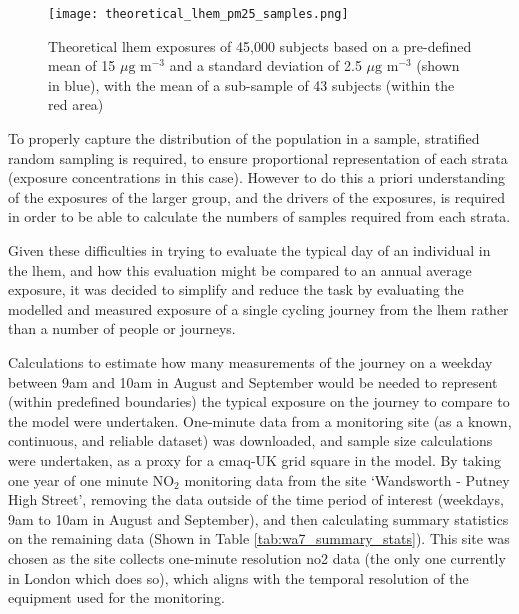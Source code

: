 \begin{figure}[H]
\centering
\texttt{[image: theoretical\_lhem\_pm25\_samples.png]}
\caption{Theoretical \gls{lhem} exposures of 45,000 subjects based on a pre-defined mean of 15 $\mu \text{g m}^{-3}$ and a standard deviation of 2.5 $\mu \text{g m}^{-3}$ (shown in blue), with the mean of a sub-sample of 43 subjects (within the red area)}
\label{fig:theoretical_lhem_pm25_samples}
\end{figure}

To properly capture the distribution of the population in a sample, stratified random sampling is required, to ensure proportional representation of each strata (exposure concentrations in this case). However to do this a priori understanding of the exposures of the larger group, and the drivers of the exposures, is required in order to be able to calculate the numbers of samples required from each strata.

Given these difficulties in trying to evaluate the typical day of an individual in the \gls{lhem}, and how this evaluation might be compared to an annual average exposure, it was decided to simplify and reduce the task by evaluating the modelled and measured exposure of a single cycling journey from the \gls{lhem} rather than a number of people or journeys.

Calculations to estimate how many measurements of the journey on a weekday between 9am and 10am in August and September would be needed to represent (within predefined boundaries) the typical exposure on the journey to compare to the model were undertaken. One-minute data from a monitoring site (as a known, continuous, and reliable dataset) was downloaded, and sample size calculations were undertaken, as a proxy for a \gls{cmaq}-UK grid square in the model. By taking one year of one minute NO$_{2}$ monitoring data from the site ‘Wandsworth - Putney High Street’, removing the data outside of the time period of interest (weekdays, 9am to 10am in August and September), and then calculating summary statistics on the remaining data (Shown in Table \ref{tab:wa7_summary_stats}). This site was chosen as the site collects one-minute resolution \gls{no2} data (the only one currently in London which does so), which aligns with the temporal resolution of the equipment used for the monitoring.

